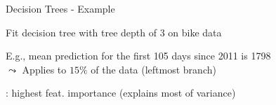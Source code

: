 \documentclass[10pt,compress,t,notes=noshow, xcolor=table]{beamer}
\begin{document}
\begin{framev}[align=top]{Decision Trees - Example}
\begin{itemizeM}
\item Fit decision tree with tree depth of 3 on bike data
\item E.g., mean prediction for the first 105 days since 2011 is 1798\\
$\leadsto$ Applies to $15\%$ of the data (leftmost branch)
\item {}: highest feat. importance (explains most of variance)
\end{itemizeM}
\end{framev}








\end{document}
